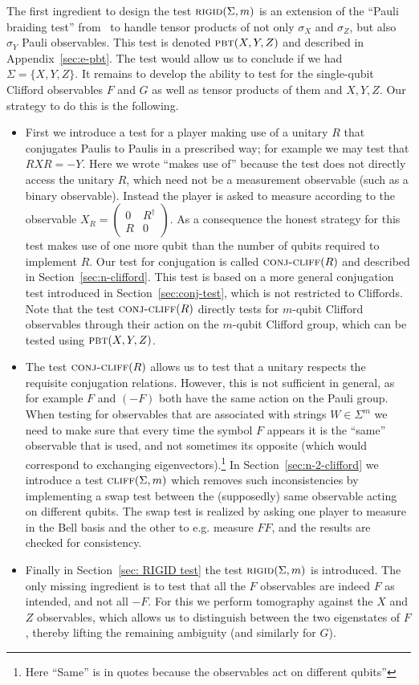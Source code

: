 The first ingredient to design the test $\textsc{rigid}(\Sigma,m)$ is an extension of the ``Pauli braiding test'' from~\cite{natarajan2016robust} to handle tensor products of not only $\sigma_X$ and $\sigma_Z$, but also $\sigma_Y$ Pauli observables. This test is denoted $\textsc{pbt}(X,Y,Z)$ and described in Appendix~\ref{sec:e-pbt}. The test would allow us to conclude if we had $\Sigma=\{X,Y,Z\}$. It remains to develop the ability to test for the single-qubit Clifford observables $F$ and $G$ as well as tensor products of them and $X,Y,Z$. Our strategy to do this is the following.
\begin{itemize}
\item First we introduce a test for a player making use of a unitary $R$ that conjugates Paulis to Paulis in a prescribed way; for example we may test that $RXR=-Y$. Here we wrote ``makes use of'' because the test does not directly access the unitary $R$, which need not be a measurement observable (such as a binary observable). Instead the player is asked to measure according to the observable $X_R = \begin{pmatrix} 0 & R^\dagger \\ R & 0 \end{pmatrix}$. As a consequence the honest strategy for this test makes use of one more qubit than the number of qubits required to implement $R$. Our test for conjugation is called $\textsc{conj-cliff}(R)$ and described in Section~\ref{sec:n-clifford}. This test is based on a more general conjugation test introduced in Section~\ref{sec:conj-test}, which is not restricted to Cliffords. Note that the test $\textsc{conj-cliff}(R)$ directly tests for $m$-qubit Clifford observables through their action on the $m$-qubit Clifford group, which can be tested using $\textsc{pbt}(X,Y,Z)$. 
\item The test $\textsc{conj-cliff}(R)$ allows us to test that a unitary respects the requisite conjugation relations. However, this is not sufficient in general, as for example $F$ and $(-F)$ both have the same action on the Pauli group. When testing for observables that are associated with strings $W\in\Sigma^m$ we need to make sure that every time the symbol $F$ appears it is the ``same'' observable that is used, and not sometimes its opposite (which would correspond to exchanging eigenvectors).\footnote{Here ``Same'' is in quotes because the observables act on different qubits''} In Section~\ref{sec:n-2-clifford} we introduce a test $\textsc{cliff}(\Sigma,m)$ which removes such inconsistencies by implementing a swap test between the (supposedly) same observable acting on different qubits. The swap test is realized by asking one player to measure in the Bell basis and the other to e.g. measure $FF$, and the results are checked for consistency. 
\item Finally in Section~\ref{sec: RIGID test} the test $\textsc{rigid}(\Sigma,m)$ is introduced. The only missing ingredient is to test that all the $F$ observables are indeed $F$ as intended, and not all $-F$. For this we perform tomography against the $X$ and $Z$ observables, which allows us to distinguish between the two eigenstates of $F$, thereby lifting the remaining ambiguity (and similarly for $G$).
\end{itemize}

